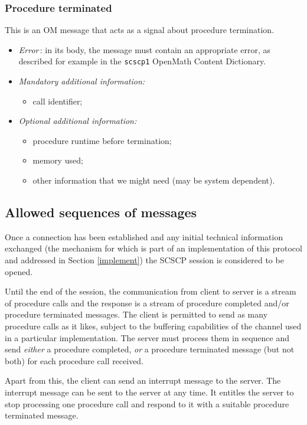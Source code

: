 \documentclass{amsart}
\begin{document}
\subsubsection{Procedure terminated}

This is an OM message that acts as a signal about procedure termination.
\begin{itemize}
\item {\it Error}\,: in its body, the message must contain an appropriate error, as described for example in the {\tt scscp1} OpenMath Content Dictionary.
\item {\it Mandatory additional information:}
\begin{itemize}
\item call identifier;
\end{itemize}
\item {\it Optional additional information:}
\begin{itemize}
\item procedure runtime before termination;
\item memory used;
\item other information that we might need (may be system dependent).
\end{itemize}
\end{itemize}

\subsection{Allowed sequences of messages}\label{sec_semt_allowedseq}

Once a connection has been established and any initial technical
information exchanged (the mechanism for which is
part of an implementation of this protocol and addressed in Section
\ref{implement}) the SCSCP session is considered to be opened.

Until the end of the session, the communication from client to server is 
a stream of procedure calls and the response is a stream of procedure 
completed and/or procedure terminated messages. The client is permitted 
to send as many procedure calls as it likes, subject to the buffering 
capabilities of the channel used in a particular implementation. The server must
process them in sequence and send {\it either} a procedure completed, 
{\it or} a procedure terminated message (but not both) for each procedure call received.

Apart from this, the client can send an interrupt message to the server.
The interrupt message can be sent to the server at any time. 
It entitles the server to stop processing one procedure call and 
respond to it with a suitable procedure terminated message. 
\end{document}
